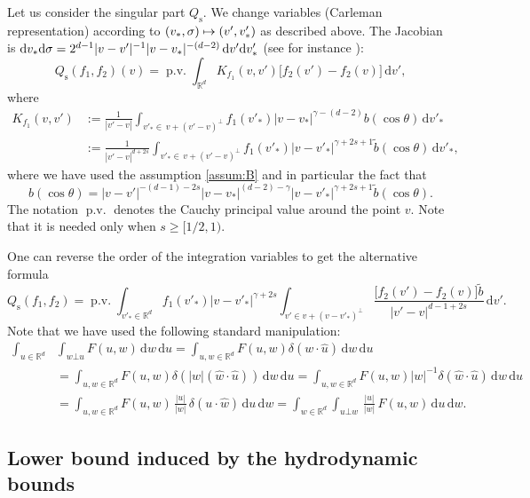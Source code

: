 \documentclass[JEP,XML,SOM,Unicode,NoFloatCountersInSection]{cedram}
\newcommand\mto{\mathchoice{\longmapsto}{\mapsto}{\mapsto}{\mapsto}}
\newcommand{\rs}{\mathrm{s}}
\theoremstyle{plain}
\theoremstyle{definition}
\numberwithin{equation}{section}
\newcommand{\R}{\mathbb R}
\newcommand{\dd} {\, \mathrm{d}}
\DeclareMathOperator{\PV}{p.v.}
\begin{document}
Let us consider the singular part $Q_{\rs}$. We change variables (Carleman
representation) according to $(v_*,\sigma) \mto (v',v'_*)$ as
described above. The Jacobian is
${\rm d} v_* {\rm d}\sigma = 2^{d-1} |v-v'|^{-1} |v-v_*|^{-(d-2)} \, {\rm d} v'
{\rm d} v'_*$ (see for instance \cite[Lem.\,A.1]{luis}):
\begin{equation}\label{eq:Carl-rep}
Q_{\rs}(f_1,f_2)(v) = \PV \int_{\R^d} K_{f_1}(v,v') \big[ f_2(v')-f_2(v) \big] \dd v',
\end{equation}
where
\begin{align} \nonumber
K_{f_1}(v,v') & := \frac{1}{|v'-v|} \int_{v'_* \in \, v +
(v'-v)^\bot} f_1(v'_*) |v-v_*|^{\gamma-(d-2)} b(\cos \theta) \dd
v'_* \\ \label{e:kernel-K}
& := \frac{1}{|v'-v|^{d+2s}} \int_{v'_* \in \, v +
(v'-v)^\bot} f_1(v'_*) |v-v'_*|^{\gamma+2s+1} \tilde b(\cos \theta) \dd
v'_*,
\end{align}
where we have used the assumption \eqref{assum:B} and in particular
the fact that
\[
b(\cos \theta) = |v-v'|^{-(d-1)-2s}
|v-v_*|^{(d-2)-\gamma} |v-v'_*|^{\gamma+2s+1} \tilde b(\cos
\theta).
\]
The notation $\PV$ denotes the Cauchy principal value around
the point $v$. Note that it is needed only when $s \ge [1/2,1)$.

One can reverse the order of the integration variables to get the
alternative formula%
\begin{equation}\label{eq:Carl-rep-reverse}
Q_{\rs}(f_1,f_2) = \PV \int_{v'_* \in \R^d} f_1(v'_*) |v-v'_*|^{\gamma+2s}
\int_{v'\in v +
(v-v'_*)^\bot} \frac{\big[ f_2(v')-f_2(v) \big] \tilde b}{|v'-v|^{d-1+2s}} \dd v'.
\end{equation}
Note that we have used the following standard manipulation:
\begin{align*}
\int_{u \in \R^d} &\int_{w \bot u} F(u,w) \dd w \dd u = \int_{u,w\in \R^d}
F(u,w) \delta(w \cdot \hat u) \dd w \dd u \\
& = \int_{u,w\in \R^d} F(u,w) \delta(|w| (\hat w \cdot \hat u))
\dd w \dd u
= \int_{u,w\in \R^d} F(u,w) |w|^{-1} \delta(\hat w \cdot \hat
u) \dd w \dd u\\
& = \int_{u,w\in \R^d} F(u,w) \,\frac{|u|}{|w|}\, \delta(u \cdot \hat
w) \dd u \dd w = \int_{w \in \R^d} \int_{u \bot w}
\,\frac{|u|}{|w|}\, F(u,w) \dd u \dd w.
\end{align*}

\subsection{Lower bound induced by the hydrodynamic bounds}
\end{document}
